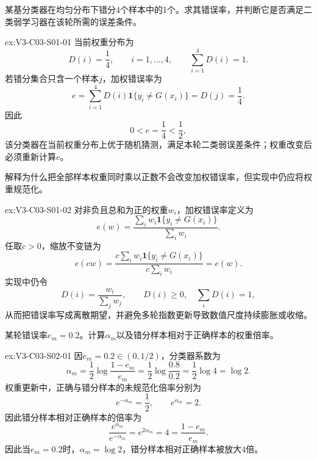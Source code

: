 \begin{SLChapterExercisePairSection}

\begin{exercise}\label{ex:V3-C03-S01-01}
某基分类器在均匀分布下错分$4$个样本中的1个。求其错误率，并判断它是否满足二类弱学习器在该轮所需的误差条件。
\end{exercise}
\ifSLFullEdition
{}\label{sol:V3-C03-S01-01}
\begin{chapterexercisesolution}{ex:V3-C03-S01-01}
当前权重分布为
\[
D(i)=\frac14,
\qquad i=1,\ldots,4,
\qquad \sum_{i=1}^{4}D(i)=1.
\]
若错分集合只含一个样本$j$，加权错误率为
\[
e=\sum_{i=1}^{4}D(i)\mathbf1\{y_i\neq G(x_i)\}
=D(j)=\frac14.
\]
因此
\[
0<e=\frac14<\frac12,
\]
该分类器在当前权重分布上优于随机猜测，满足本轮二类弱误差条件；权重改变后必须重新计算$e$。
\end{chapterexercisesolution}
\fi

\begin{exercise}\label{ex:V3-C03-S01-02}
解释为什么把全部样本权重同时乘以正数不会改变加权错误率，但实现中仍应将权重规范化。
\end{exercise}
\ifSLFullEdition
{}\label{sol:V3-C03-S01-02}
\begin{chapterexercisesolution}{ex:V3-C03-S01-02}
对非负且总和为正的权重$w_i$，加权错误率定义为
\[
e(w)=\frac{\sum_iw_i\mathbf1\{y_i\neq G(x_i)\}}{\sum_iw_i}.
\]
任取$c>0$，缩放不变链为
\[
e(cw)
=\frac{c\sum_iw_i\mathbf1\{y_i\neq G(x_i)\}}{c\sum_iw_i}
=e(w).
\]
实现中仍令
\[
D(i)=\frac{w_i}{\sum_jw_j},
\qquad D(i)\geq0,\quad \sum_iD(i)=1,
\]
从而把错误率写成离散期望，并避免多轮指数更新导致数值尺度持续膨胀或收缩。
\end{chapterexercisesolution}
\fi

\begin{exercise}\label{ex:V3-C03-S02-01}
某轮错误率$e_m=0.2$。计算$\alpha_m$以及错分样本相对于正确样本的权重倍率。
\end{exercise}
\ifSLFullEdition
{}\label{sol:V3-C03-S02-01}
\begin{chapterexercisesolution}{ex:V3-C03-S02-01}
因$e_m=0.2\in(0,1/2)$，分类器系数为
\[
\alpha_m
=\frac12\log\frac{1-e_m}{e_m}
=\frac12\log\frac{0.8}{0.2}
=\frac12\log4
=\log2.
\]
权重更新中，正确与错分样本的未规范化倍率分别为
\[
e^{-\alpha_m}=\frac12,
\qquad
e^{\alpha_m}=2.
\]
因此错分样本相对正确样本的倍率为
\[
\frac{e^{\alpha_m}}{e^{-\alpha_m}}
=e^{2\alpha_m}=4
=\frac{1-e_m}{e_m}.
\]
因此当$e_m=0.2$时，$\alpha_m=\log2$，错分样本相对正确样本被放大$4$倍。
\end{chapterexercisesolution}
\fi


\end{SLChapterExercisePairSection}
